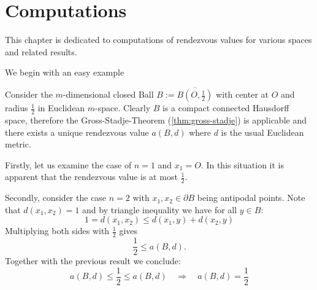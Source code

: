 \chapter{Computations}\label{computations}
This chapter is dedicated to computations of rendezvous values for various spaces and related results.

We begin with an easy example
\begin{example}
	Consider the $m$-dimensional closed Ball $B:=\overline{B(O,\frac{1}{2})}$ with center at $O$ and radius $\frac{1}{2}$ in Euclidean $m$-space. Clearly $B$ is a compact connected Hausdorff space, therefore the Gross-Stadje-Theorem (\autoref{thm:gross-stadje})
	is applicable and there exists a unique rendezvous value $a(B,d)$ where $d$ is the usual Euclidean metric.
	
	Firstly, let us examine the case of $n=1$ and $x_1=O$. In this situation it is apparent that the rendezvous value is at most $\frac{1}{2}$.
	
	Secondly, consider the case $n=2$ with $x_1,x_2\in \partial B$ being antipodal points. Note that $d(x_1,x_2)=1$ and by triangle inequality we have for all $y\in B$:
	\[
	1=d(x_1,x_2)\leq d(x_1,y)+d(x_2,y)
	\]
	Multiplying both sides with $\frac{1}{2}$ gives
	\[
	\frac{1}{2}\leq a(B,d).
	\]
	Together with the previous result we conclude:
	\[
	a(B,d)\leq\frac{1}{2}\leq a(B,d)\quad \Rightarrow\quad a(B,d)=\frac{1}{2}
	\]
\end{example}

